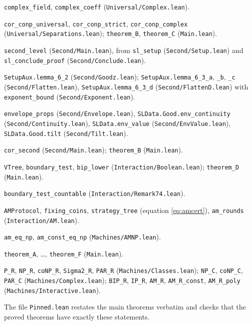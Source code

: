 \begin{description}[leftmargin=1.6em,itemsep=1pt,font=\normalfont\bfseries]
\item[\Cref{thm:complex,rem:complexcoef}] \texttt{complex\_field}, \texttt{complex\_coeff} (\texttt{Universal/Complex.lean}).
\item[\Cref{cor:conp}] \texttt{cor\_conp\_universal}, \texttt{cor\_conp\_strict}, \texttt{cor\_conp\_complex} (\texttt{Universal/Separations.lean}); \texttt{theorem\_B}, \texttt{theorem\_C} (\texttt{Main.lean}).
\item[\Cref{thm:second}] \texttt{second\_level} (\texttt{Second/Main.lean}), from \texttt{sl\_setup} (\texttt{Second/Setup.lean}) and \texttt{sl\_conclude\_proof} (\texttt{Second/Conclude.lean}).
\item[\Cref{lem:goodz,lem:flatten}] \texttt{SetupAux.lemma\_6\_2} (\texttt{Second/Goodz.lean}); \texttt{SetupAux.lemma\_6\_3\_a}, \texttt{\_b}, \texttt{\_c} (\texttt{Second/Flatten.lean}), \texttt{SetupAux.lemma\_6\_3\_d} (\texttt{Second/FlattenD.lean}) with \texttt{exponent\_bound} (\texttt{Second/Exponent.lean}).
\item[\Cref{lem:envelope,lem:continuity,lem:envelopevalue,lem:tilt}] \texttt{envelope\_props} (\texttt{Second/Envelope.lean}), \texttt{SLData.Good.env\_continuity} (\texttt{Second/Continuity.lean}), \texttt{SLData.env\_value} (\texttt{Second/EnvValue.lean}), \texttt{SLData.Good.tilt} (\texttt{Second/Tilt.lean}).
\item[\Cref{cor:second}] \texttt{cor\_second} (\texttt{Second/Main.lean}); \texttt{theorem\_B} (\texttt{Main.lean}).
\item[\Cref{def:bip,lem:boolean,thm:bip}] \texttt{VTree}, \texttt{boundary\_test}, \texttt{bip\_lower} (\texttt{Interaction/Boolean.lean}); \texttt{theorem\_D} (\texttt{Main.lean}).
\item[\Cref{rem:discrete}(a)] \texttt{boundary\_test\_countable} (\texttt{Interaction/Remark74.lean}).
\item[\Cref{def:am,lem:coins,thm:amper}] \texttt{AMProtocol}, \texttt{fixing\_coins}, \texttt{strategy\_tree} (equation \eqref{eq:amcert}), \texttt{am\_rounds} (\texttt{Interaction/AM.lean}).
\item[\Cref{thm:am}] \texttt{am\_eq\_np}, \texttt{am\_const\_eq\_np} (\texttt{Machines/AMNP.lean}).
\item[\Cref{thm:A,thm:B,thm:C,thm:D,thm:E,thm:F}] \texttt{theorem\_A}, \dots, \texttt{theorem\_F} (\texttt{Main.lean}).
\item[Classes] \texttt{P\_R}, \texttt{NP\_R}, \texttt{coNP\_R}, \texttt{Sigma2\_R}, \texttt{PAR\_R} (\texttt{Machines/Classes.lean}); \texttt{NP\_C}, \texttt{coNP\_C}, \texttt{PAR\_C} (\texttt{Machines/Complex.lean}); \texttt{BIP\_R}, \texttt{IP\_R}, \texttt{AM\_R}, \texttt{AM\_R\_const}, \texttt{AM\_R\_poly} (\texttt{Machines/Interactive.lean}).
\end{description}

The file \texttt{Pinned.lean} restates the main theorems verbatim and checks that the proved theorems have exactly these statements.
\par\endgroup
